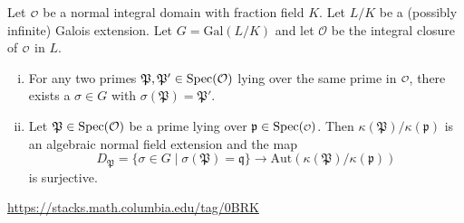 \begin{proposition}{}{}
    Let $\mathcalo$ be a normal integral domain with fraction field $K$. Let $L/K$ be a (possibly infinite) Galois extension. Let $G = \text{Gal}(L/K)$ and let
    $\mathcal{O}$ be the integral closure of $\mathcalo$ in $L$.
\begin{enumerate}[(i)]
    \item For any two primes
    $\mathfrak P, \mathfrak P' \in \operatorname{Spec}(\mathcal{O})$ lying over the same prime in $\mathcalo$, there exists a $\sigma \in G$ with $\sigma(\mathfrak P) = \mathfrak P'$.
    \item Let $\mathfrak P \in \operatorname{Spec}(\mathcal{O}) $ be a prime lying over
    $\mathfrak p \in \spec(\mathcalo)$. Then $\kappa(\mathfrak P)/\kappa(\mathfrak p)$
    is an algebraic normal field extension and the map
    $$
    D_{\mathfrak P} = \{\sigma \in G \mid \sigma(\mathfrak P) = \mathfrak q\}
    \longrightarrow
    \text{Aut}(\kappa(\mathfrak P)/\kappa(\mathfrak p))
    $$
is surjective.
\end{enumerate}
\end{proposition}
\begin{prf}
\url{https://stacks.math.columbia.edu/tag/0BRK}
\end{prf}

